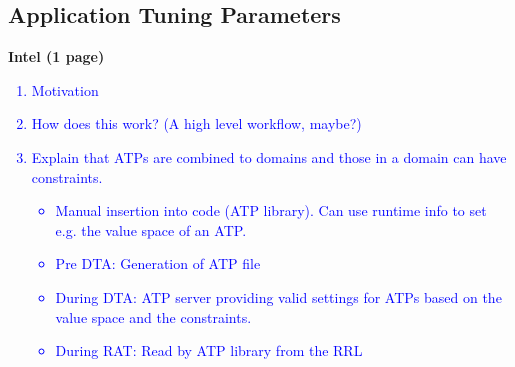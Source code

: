 \subsection{Application Tuning Parameters} \label{sec:atp}
\textbf{Intel (1 page)}
\textcolor{blue}{\begin{enumerate}
	\item Motivation
	\item How does this work? (A high level workflow, maybe?)
	\item Explain that ATPs are combined to domains and those in a domain can have constraints. 
	\begin{itemize}
		\item Manual insertion into code (ATP library). Can use runtime info to set e.g. the value space of an ATP.
		\item Pre DTA: Generation of ATP file
		\item During DTA: ATP server providing valid settings for ATPs based on the value space and the constraints.
		\item During RAT: Read by ATP library from the RRL
	\end{itemize}
\end{enumerate}}